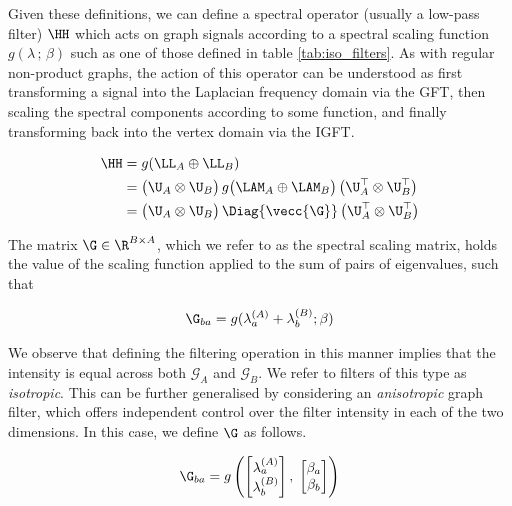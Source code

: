 Given these definitions, we can define a spectral operator (usually a low-pass filter) $\HH$ which acts on graph signals according to a spectral scaling function $g(\lambda \,; \, \beta)$ such as one of those defined in table \ref{tab:iso_filters}. As with regular non-product graphs, the action of this operator can be understood as first transforming a signal into the Laplacian frequency domain via the GFT, then scaling the spectral components according to some function, and finally transforming back into the vertex domain via the IGFT.

\begin{align}
    \label{eq:graph_filter}
    \HH & = g(\LL_A \oplus \LL_B) \notag                                                                                          \\
        & = \big( \U_A \otimes \U_B \big) \, g \big( \LAM_A \oplus \LAM_B \big) \, \big( \U_A^\top \otimes \U_B^\top \big) \notag \\
        & = \big( \U_A \otimes \U_B \big) \, \Diag{\vecc{\G}} \, \big( \U_A^\top \otimes \U_B^\top \big)
\end{align}


The matrix $\G \in \R^{B \times A}$, which we refer to as the spectral scaling matrix, holds the value of the scaling function applied to the sum of
pairs of eigenvalues, such that

\begin{equation}
    \label{eq:Gba}
    \G_{ba} = g(\lambda^{(A)}_a + \lambda^{(B)}_b; \beta)
\end{equation}



We observe that defining the filtering operation in this manner implies that the intensity is equal across both $\mathcal{G}_A$ and $\mathcal{G}_B$. We refer to filters of this type as \textit{isotropic}. This can be further generalised by considering an \textit{anisotropic} graph filter, which offers independent control over the filter intensity in each of the two dimensions. In this case, we define $\G$ as follows.

\begin{equation}
    \label{eq:Gba2}
    \G_{ba} =  g \left( \begin{bmatrix}
            \lambda^{(A)}_a \\ \lambda^{(B)}_b
        \end{bmatrix}, \; \begin{bmatrix}
            \beta_a \\ \beta_b
        \end{bmatrix} \right)
\end{equation}

